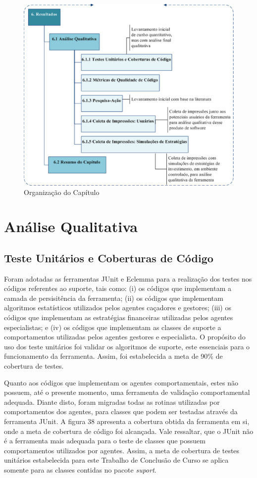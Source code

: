 \begin{figure}[h!]
\centering
\label{f10}
\includegraphics[width=1\textwidth]{figuras/cap6}
\caption{Organização do Capítulo}
\end{figure}
\FloatBarrier

\section{Análise Qualitativa}
\subsection{Teste Unitários e Coberturas de Código}

Foram adotadas as ferramentas JUnit e Eclemma para a realização dos testes nos códigos referentes ao suporte, tais como: (i) os códigos que implementam a camada de persisitência da ferramenta; (ii) os códigos que implementam algoritmos estatísticos utilizados pelos agentes caçadores e gestores; (iii) os códigos que implementam as estratégias financeiras utilizadas pelos agentes especialistas; e (iv) os códigos que implementam as classes de suporte a comportamentos utilizadas pelos agentes gestores e especialista. O propósito do uso dos teste unitários foi validar os algoritmos de suporte, este essenciais para o funcionamento da ferramenta. Assim, foi estabelecida a meta de 90\% de cobertura de testes.

Quanto aos códigos que implementam os agentes comportamentais, estes não possuem, até o presente momento, uma ferramenta de validação comportamental adequada. Diante disto, foram migradas todas as rotinas utilizadas por comportamentos dos agentes, para classes que podem ser testadas através da ferramenta JUnit. A figura 38 apresenta a cobertura obtida da ferramenta em si, onde a meta de cobertura de código foi alcançada. Vale ressaltar, que o JUnit não é a ferramenta mais adequada para o teste de classes que possuem comportamentos utilizados por agentes. Assim, a meta de cobertura de testes unitários estabelecida para este Trabalho de Conclusão de Curso se aplica somente para as classes contidas no pacote \textit{suport}.

